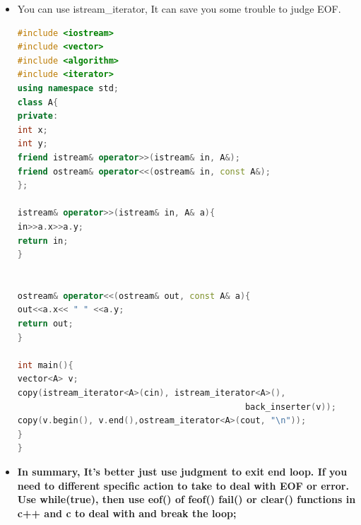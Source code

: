 \documentclass[a4paper,12pt,twoside]{book}
\begin{document}
\begin{itemize}
\begin{lstlisting}[frame=single, language=c++]
while(!issapce(cin.get()))
            continue;  //method 2

basic_istream& ignore(streamsize _Count = 1, \
int_type _Delim = traits_type::eof());  //method 3
cin.ignore(5, 'a');
cin.ignore(numeric_limits<streamsize>::max(), '\n');
\end{lstlisting}

\item You can use istream\_iterator, It can save you some trouble to judge EOF.
\begin{lstlisting}[frame=single, language=c++]
#include <iostream>
#include <vector>
#include <algorithm>
#include <iterator>
using namespace std;
class A{
private:
int x;
int y;
friend istream& operator>>(istream& in, A&);
friend ostream& operator<<(ostream& in, const A&);
};

istream& operator>>(istream& in, A& a){
in>>a.x>>a.y;
return in;
}


ostream& operator<<(ostream& out, const A& a){
out<<a.x<< " " <<a.y;
return out;
}

int main(){
vector<A> v;
copy(istream_iterator<A>(cin), istream_iterator<A>(),
                                             back_inserter(v));
copy(v.begin(), v.end(),ostream_iterator<A>(cout, "\n"));
}
}
\end{lstlisting}


\item \textbf{In summary, It's better just use judgment to exit end loop.  If you need to different specific action to take to deal with EOF or error. Use while(true), then use eof() of feof() fail() or clear() functions in c++ and c to deal with and break the loop; }

\end{itemize}
\end{document}
